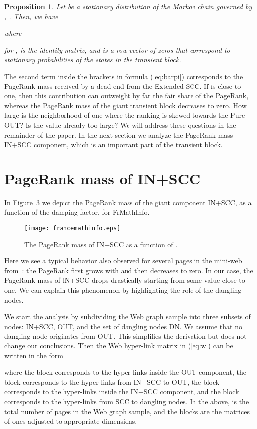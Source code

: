 \documentclass{article}
\newtheorem{proposition}{Proposition}
\begin{document}
\begin{proposition}
\label{prop:pure_out}
Let  be a stationary distribution of the Markov
chain governed by , .
Then, we have

where

for ,  is the identity matrix, and  is a row
vector of zeros that correspond to stationary probabilities of the
states in the transient block.
\end{proposition}


The second term inside the brackets in formula (\ref{eq:barpi})
corresponds to the Page\-Rank mass received by a dead-end
 from the Extended SCC. If  is close to one, then this
contribution can outweight by far the fair share of the PageRank,
whereas the PageRank mass of the giant transient block decreases to
zero. How large is the neighborhood of one where the ranking is
skewed towards the Pure OUT? Is the value  already too
large? We will address these questions in the remainder of the
paper. In the next section we analyze the PageRank mass IN+SCC
component, which is an important part of the transient block.


\section{PageRank mass of IN+SCC}
\label{sec:scc}

In Figure~3 we depict the PageRank mass of the giant component
IN+SCC, as a function of the damping factor, for FrMathInfo.
\begin{figure}
\centering
\texttt{[image: francemathinfo.eps]} \label{fig:in+scc}
\caption{The PageRank mass of IN+SCC as a function of .}
\end{figure}
Here we see a typical behavior also observed for several pages in
the mini-web from~\cite{Boldi05}: the PageRank first grows with 
and then decreases to zero. In our case, the PageRank mass of IN+SCC
drops drastically starting from some value  close to one. We can
explain this phenomenon by highlighting the role of the dangling
nodes.

We start the analysis by subdividing the Web graph sample into three
subsets of nodes: IN+SCC, OUT, and the set of dangling nodes DN. We
assume that no dangling node originates from OUT. This simplifies
the derivation but does not change our conclusions. Then the Web
hyper-link matrix  in (\ref{eq:w}) can be written in the form

where the block  corresponds to the hyper-links inside the OUT
component, the block  corresponds to the hyper-links from IN+SCC
to OUT, the block  corresponds to the hyper-links inside the
IN+SCC component, and the block  corresponds to the hyper-links
from SCC to dangling nodes.  In the above,  is the total number
of pages in the Web graph sample, and the blocks  are
the matrices of ones adjusted to appropriate dimensions.
\end{document}
